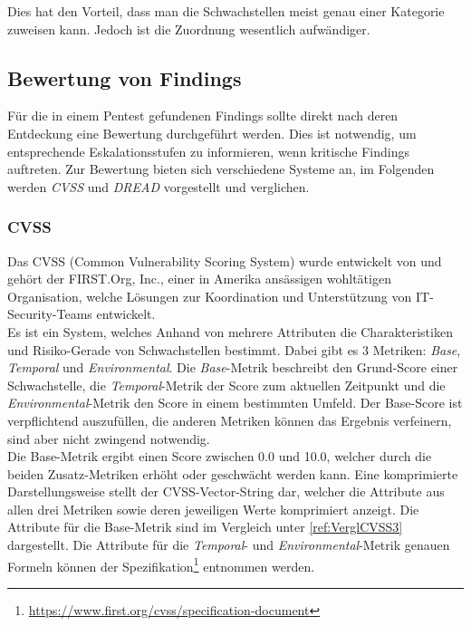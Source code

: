 		Dies hat den Vorteil, dass man die Schwachstellen meist genau einer Kategorie zuweisen kann. Jedoch ist die Zuordnung wesentlich aufwändiger.
			
	\subsection{Bewertung von Findings}
	Für die in einem Pentest gefundenen Findings sollte direkt nach deren Entdeckung eine Bewertung durchgeführt werden. Dies ist notwendig, um entsprechende Eskalationsstufen zu informieren, wenn kritische Findings auftreten. Zur Bewertung bieten sich verschiedene Systeme an, im Folgenden werden \textit{CVSS} und \textit{DREAD} vorgestellt und verglichen.
	
			\subsubsection{CVSS}
			Das CVSS (Common Vulnerability Scoring System) wurde entwickelt von und gehört der FIRST.Org, Inc., einer in Amerika ansässigen wohltätigen Organisation, welche Lösungen zur Koordination und Unterstützung von IT-Security-Teams entwickelt.\\
			
			Es ist ein System, welches Anhand von mehrere Attributen die Charakteristiken und Risiko-Gerade von Schwachstellen bestimmt. Dabei gibt es 3 Metriken: \textit{Base}, \textit{Temporal} und \textit{Environmental}. Die \textit{Base}-Metrik beschreibt den Grund-Score einer Schwachstelle, die \textit{Temporal}-Metrik der Score zum aktuellen Zeitpunkt und die  \textit{Environmental}-Metrik den Score in einem bestimmten Umfeld. Der Base-Score ist verpflichtend auszufüllen, die anderen Metriken können das Ergebnis verfeinern, sind aber nicht zwingend notwendig.\\
			
			Die Base-Metrik ergibt einen Score zwischen 0.0 und 10.0, welcher durch die beiden Zusatz-Metriken erhöht oder geschwächt werden kann. Eine komprimierte Darstellungsweise stellt der CVSS-Vector-String dar, welcher die Attribute aus allen drei Metriken sowie deren jeweiligen Werte komprimiert anzeigt. Die Attribute für die Base-Metrik sind im Vergleich unter \ref{ref:VerglCVSS3} dargestellt. Die Attribute für die \textit{Temporal}- und \textit{Environmental}-Metrik genauen Formeln können der Spezifikation\footnote{\url{https://www.first.org/cvss/specification-document}} entnommen werden.\cite{FIRSTCVSS}\\
		
